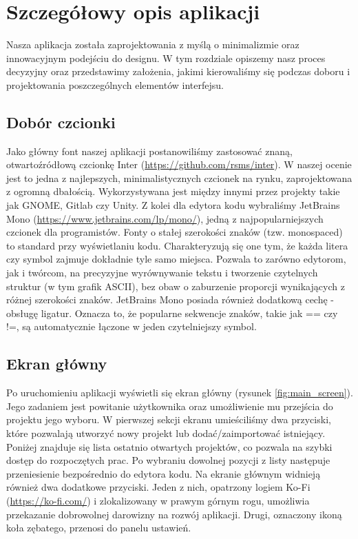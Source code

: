 \chapter{Szczegółowy opis aplikacji}

Nasza aplikacja została zaprojektowania z myślą o minimalizmie oraz innowacyjnym podejściu do designu. W tym rozdziale opiszemy nasz proces decyzyjny oraz przedstawimy założenia, jakimi kierowaliśmy się podczas doboru i projektowania poszczególnych elementów interfejsu.

\section{Dobór czcionki}

Jako główny font naszej aplikacji postanowiliśmy zastosować znaną, otwartoźródłową czcionkę Inter (\url{https://github.com/rsms/inter}). W naszej ocenie jest to jedna z najlepszych, minimalistycznych czcionek na rynku, zaprojektowana z ogromną dbałością. Wykorzystywana jest między innymi przez projekty takie jak GNOME, Gitlab czy Unity.
\newline\newline
Z kolei dla edytora kodu wybraliśmy JetBrains Mono (\url{https://www.jetbrains.com/lp/mono/}), jedną z najpopularniejszych czcionek dla programistów. Fonty o stałej szerokości znaków (tzw. monospaced) to standard przy wyświetlaniu kodu. Charakteryzują się one tym, że każda litera czy symbol zajmuje dokładnie tyle samo miejsca. Pozwala to zarówno edytorom, jak i twórcom, na precyzyjne wyrównywanie tekstu i tworzenie czytelnych struktur (w tym grafik ASCII), bez obaw o zaburzenie proporcji wynikających z różnej szerokości znaków. JetBrains Mono posiada również dodatkową cechę - obsługę ligatur. Oznacza to, że popularne sekwencje znaków, takie jak == czy !=, są automatycznie łączone w jeden czytelniejszy symbol.

\section{Ekran główny}

Po uruchomieniu aplikacji wyświetli się ekran główny (rysunek \ref{fig:main_screen}). Jego zadaniem jest powitanie użytkownika oraz umożliwienie mu przejścia do projektu jego wyboru.
\newline\newline
W pierwszej sekcji ekranu umieściliśmy dwa przyciski, które pozwalają utworzyć nowy projekt lub dodać/zaimportować istniejący. Poniżej znajduje się lista ostatnio otwartych projektów, co pozwala na szybki dostęp do rozpoczętych prac. Po wybraniu dowolnej pozycji z listy następuje przeniesienie bezpośrednio do edytora kodu.
\newline\newline
Na ekranie głównym widnieją również dwa dodatkowe przyciski. Jeden z nich, opatrzony logiem Ko-Fi (\url{https://ko-fi.com/}) i zlokalizowany w prawym górnym rogu, umożliwia przekazanie dobrowolnej darowizny na rozwój aplikacji. Drugi, oznaczony ikoną koła zębatego, przenosi do panelu ustawień.

